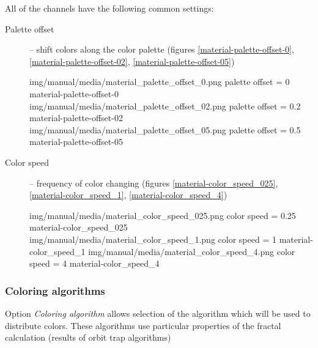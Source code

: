 All of the channels have the following common settings:
\begin{description}
	\item[Palette offset] -- shift colors along the color palette (figures \ref{material-palette-offset-0}, \ref{material-palette-offset-02}, \ref{material-palette-offset-05})
	
	\threeImagesWithTwoCaptionsFullWidth
	{img/manual/media/material_palette_offset_0.png}
	{palette offset = 0}
	{material-palette-offset-0}
	{img/manual/media/material_palette_offset_02.png}
	{palette offset = 0.2}
	{material-palette-offset-02}
	{img/manual/media/material_palette_offset_05.png}
	{palette offset = 0.5}
	{material-palette-offset-05}
	
	\item[Color speed] -- frequency of color changing (figures \ref{material-color_speed_025}, \ref{material-color_speed_1}, \ref{material-color_speed_4})
	
	\threeImagesWithTwoCaptionsFullWidth
	{img/manual/media/material_color_speed_025.png}
	{color speed = 0.25}
	{material-color_speed_025}
	{img/manual/media/material_color_speed_1.png}
	{color speed = 1}
	{material-color_speed_1}
	{img/manual/media/material_color_speed_4.png}
	{color speed = 4}
	{material-color_speed_4}
\end{description}
	
\subsubsection{Coloring algorithms}\label{materials-coloring-algorithms}
	
Option \emph{Coloring algorithm} allows selection of the algorithm which will be used to distribute colors. These algorithms use particular properties of the fractal calculation (results of orbit trap algorithms)

